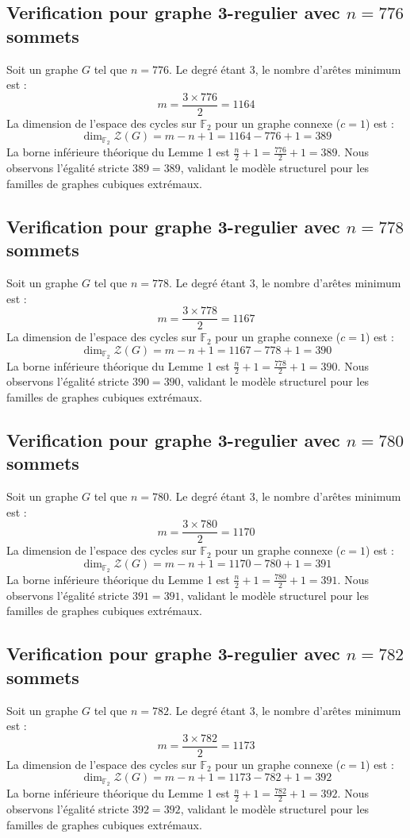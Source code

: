 \documentclass[11pt,a4paper]{article}
\begin{document}
\subsection{Verification pour graphe 3-regulier avec $n=776$ sommets}
Soit un graphe $G$ tel que $n = 776$. Le degré étant 3, le nombre d'arêtes minimum est :
$$ m = \frac{3 \times 776}{2} = 1164 $$
La dimension de l'espace des cycles sur $\mathbb{F}_2$ pour un graphe connexe ($c=1$) est :
$$ \dim_{\mathbb{F}_2} \mathcal{Z}(G) = m - n + 1 = 1164 - 776 + 1 = 389 $$
La borne inférieure théorique du Lemme 1 est $\frac{n}{2} + 1 = \frac{776}{2} + 1 = 389$.
Nous observons l'égalité stricte $389 = 389$, validant le modèle structurel pour les familles de graphes cubiques extrémaux.

\subsection{Verification pour graphe 3-regulier avec $n=778$ sommets}
Soit un graphe $G$ tel que $n = 778$. Le degré étant 3, le nombre d'arêtes minimum est :
$$ m = \frac{3 \times 778}{2} = 1167 $$
La dimension de l'espace des cycles sur $\mathbb{F}_2$ pour un graphe connexe ($c=1$) est :
$$ \dim_{\mathbb{F}_2} \mathcal{Z}(G) = m - n + 1 = 1167 - 778 + 1 = 390 $$
La borne inférieure théorique du Lemme 1 est $\frac{n}{2} + 1 = \frac{778}{2} + 1 = 390$.
Nous observons l'égalité stricte $390 = 390$, validant le modèle structurel pour les familles de graphes cubiques extrémaux.

\subsection{Verification pour graphe 3-regulier avec $n=780$ sommets}
Soit un graphe $G$ tel que $n = 780$. Le degré étant 3, le nombre d'arêtes minimum est :
$$ m = \frac{3 \times 780}{2} = 1170 $$
La dimension de l'espace des cycles sur $\mathbb{F}_2$ pour un graphe connexe ($c=1$) est :
$$ \dim_{\mathbb{F}_2} \mathcal{Z}(G) = m - n + 1 = 1170 - 780 + 1 = 391 $$
La borne inférieure théorique du Lemme 1 est $\frac{n}{2} + 1 = \frac{780}{2} + 1 = 391$.
Nous observons l'égalité stricte $391 = 391$, validant le modèle structurel pour les familles de graphes cubiques extrémaux.

\subsection{Verification pour graphe 3-regulier avec $n=782$ sommets}
Soit un graphe $G$ tel que $n = 782$. Le degré étant 3, le nombre d'arêtes minimum est :
$$ m = \frac{3 \times 782}{2} = 1173 $$
La dimension de l'espace des cycles sur $\mathbb{F}_2$ pour un graphe connexe ($c=1$) est :
$$ \dim_{\mathbb{F}_2} \mathcal{Z}(G) = m - n + 1 = 1173 - 782 + 1 = 392 $$
La borne inférieure théorique du Lemme 1 est $\frac{n}{2} + 1 = \frac{782}{2} + 1 = 392$.
Nous observons l'égalité stricte $392 = 392$, validant le modèle structurel pour les familles de graphes cubiques extrémaux.
\end{document}
